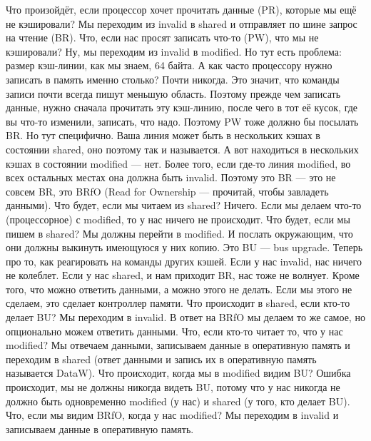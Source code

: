 \documentclass{article}
\begin{document}
    Что произойдёт, если процессор хочет прочитать данные ({\color{red}PR}), которые мы ещё не кэшировали? Мы переходим из invalid в shared и отправляет по шине запрос на чтение ({\color{darkgreen}BR}). Что, если нас просят записать что-то ({\color{red}PW}), что мы не кэшировали? Ну, мы переходим из invalid в modified. Но тут есть проблема: размер кэш-линии, как мы знаем, 64 байта. А как часто процессору нужно записать в память именно столько? Почти никогда. Это значит, что команды записи почти всегда пишут меньшую область. Поэтому прежде чем записать данные, нужно сначала прочитать эту кэш-линию, после чего в тот её кусок, где вы что-то изменили, записать, что надо. Поэтому {\color{red}PW} тоже должно бы посылать {\color{darkgreen}BR}. Но тут специфично. Ваша линия может быть в нескольких кэшах в состоянии shared, оно поэтому так и называется. А вот находиться в нескольких кэшах в состоянии modified --- нет. Более того, если где-то линия modified, во всех остальных местах она должна быть invalid. Поэтому это {\color{darkgreen}BR} --- это не совсем {\color{darkgreen}BR}, это {\color{darkgreen}BRfO} (Read for Ownership --- прочитай, чтобы завладеть данными). Что будет, если мы читаем из shared? Ничего. Если мы делаем что-то (процессорное) с modified, то у нас ничего не происходит. Что будет, если мы пишем в shared? Мы должны перейти в modified. И послать окружающим, что они должны выкинуть имеющуюся у них копию. Это {\color{darkgreen}BU} --- bus upgrade. Теперь про то, как реагировать на команды других кэшей. Если у нас invalid, нас ничего не колеблет. Если у нас shared, и нам приходит {\color{blue}BR}, нас тоже не волнует. Кроме того, что можно ответить данными, а можно этого не делать. Если мы этого не сделаем, это сделает контроллер памяти. Что происходит в shared, если кто-то делает {\color{blue}BU}? Мы переходим в invalid. В ответ на {\color{blue}BRfO} мы делаем то же самое, но опционально можем ответить данными. Что, если кто-то читает то, что у нас modified? Мы отвечаем данными, записываем данные в оперативную память и переходим в shared (ответ данными и запись их в оперативную память называется {\color{darkgreen}DataW}). Что происходит, когда мы в modified видим {\color{blue}BU}? Ошибка происходит, мы не должны никогда видеть {\color{blue}BU}, потому что у нас никогда не должно быть одновременно modified (у нас) и shared (у того, кто делает {\color{darkgreen}BU}). Что, если мы видим {\color{blue}BRfO}, когда у нас modified? Мы переходим в invalid и записываем данные в оперативную память.
\end{document}
